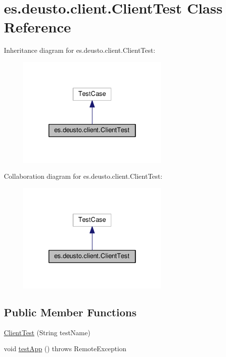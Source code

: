\hypertarget{classes_1_1deusto_1_1client_1_1_client_test}{}\section{es.\+deusto.\+client.\+Client\+Test Class Reference}
\label{classes_1_1deusto_1_1client_1_1_client_test}


Inheritance diagram for es.\+deusto.\+client.\+Client\+Test\+:
\nopagebreak
\begin{figure}[H]
\begin{center}
\leavevmode
\includegraphics[width=214pt]{classes_1_1deusto_1_1client_1_1_client_test__inherit__graph}
\end{center}
\end{figure}


Collaboration diagram for es.\+deusto.\+client.\+Client\+Test\+:
\nopagebreak
\begin{figure}[H]
\begin{center}
\leavevmode
\includegraphics[width=214pt]{classes_1_1deusto_1_1client_1_1_client_test__coll__graph}
\end{center}
\end{figure}
\subsection*{Public Member Functions}
\begin{DoxyCompactItemize}
\item 
\hyperlink{classes_1_1deusto_1_1client_1_1_client_test_a452050f3521bf56054ec20630a137e02}{Client\+Test} (String test\+Name)
\item 
void \hyperlink{classes_1_1deusto_1_1client_1_1_client_test_af869b513820b21f952c9754d3aea8d97}{test\+App} ()  throws Remote\+Exception 
\end{DoxyCompactItemize}

